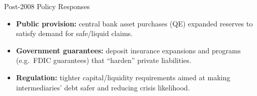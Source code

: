 \documentclass[11pt,aspectratio=169]{beamer}
\begin{document}
\begin{frame}{Post-2008 Policy Responses}
\small
\begin{itemize}
  \item \textbf{Public provision:} central bank asset purchases (QE) expanded reserves to satisfy demand for safe/liquid claims.
  \item \textbf{Government guarantees:} deposit insurance expansions and programs (e.g.\ FDIC guarantees) that ``harden'' private liabilities.
  \item \textbf{Regulation:} tighter capital/liquidity requirements aimed at making intermediaries' debt safer and reducing crisis likelihood.
\end{itemize}
\end{frame}


\end{document}
